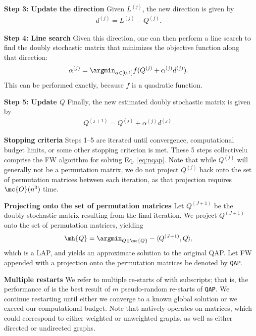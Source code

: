 \documentclass[10pt,journal,cspaper,compsoc]{IEEEtran}
\begin{document}
\textbf{Step 3: Update the direction} Given $L^{(j)}$, the new direction is given by
\begin{align}
	d^{(j)}=L^{(j)}-Q^{(j)}.
\end{align}


\textbf{Step 4: Line search} Given this direction, one can then perform a line search to find the doubly stochastic matrix that minimizes the objective function along that direction:
\begin{align}\label{eq:step}
	\alpha^{(j)} = \argmin_{\alpha \in [0,1]} f(Q^{(j)} + \alpha^{(j)} d^{(j)}).
\end{align}
This can be performed exactly, because $f$ is a quadratic function.  


\textbf{Step 5: Update $Q$} Finally, the new estimated doubly stochastic matrix is given by
\begin{align}\label{eq:update}
	Q^{(j+1)} = Q^{(j)} + \alpha^{(j)} d^{(j)}.
\end{align}


\textbf{Stopping criteria} Steps 1--5 are iterated until convergence, computational budget limits, or some other stopping criterion is met.  These 5 steps collectivelu comprise the FW algorithm for solving Eq. \eqref{eq:nqap}.  Note that while $Q^{(j)}$ will generally not be a permutation matrix, we do not project $Q^{(j)}$ back onto the set of permutation matrices between each iteration, as that projection requires $\mc{O}(n^3)$ time.


\textbf{Projecting onto the set of permutation matrices}   Let $Q^{(J+1)}$ be the doubly stochastic matrix resulting from the final iteration.  We project $Q^{(J+1)}$ onto the set of permutation matrices, yielding
\begin{align} \label{eq:proj}
	\mh{Q} = \argmin_{Q \in \mc{Q}} -\langle Q^{(J+1)}, Q \rangle,
\end{align}
which is a LAP, and yields an approximate solution to the original QAP.  Let FW appended with a projection onto the permutation matrices be denoted by \texttt{QAP}.


\textbf{Multiple restarts} We refer to multiple re-starts of \qap with subscripts; that is, the performance of \qapm is the best result of $m$ pseudo-random re-starts of \texttt{QAP}.  We continue restarting until either we converge to a known global solution or we exceed our computational budget. Note that \qap natively operates on matrices, which could correspond to either weighted or unweighted graphs, as well as either directed or undirected graphs.  
\end{document}
